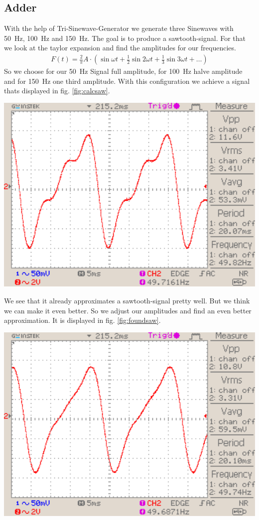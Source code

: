 \documentclass[a4paper,10pt]{article}
\newenvironment{Figure}
        {\par\medskip\noindent\minipage{\linewidth}}
        {\endminipage\par\medskip}
\numberwithin{equation}{section}
\begin{document}
\begin{multicols}{2}
	\subsection{Adder}
	With the help of Tri-Sinewave-Generator we generate three Sinewaves with \SI{50}{Hz}, \SI{100}{Hz} and \SI{150}{Hz}. The goal is to produce a sawtooth-signal. For that we look at the taylor expansion and find the amplitudes for our frequencies.
	\begin{align}
		F(t)=\frac{2}{\pi}A\cdot\left(\sin{\omega t}+\frac{1}{2}\sin{2\omega t}+\frac{1}{3}\sin{3\omega t}+\dots\right)
	\end{align}
	So we choose for our \SI{50}{Hz} Signal full amplitude, for \SI{100}{Hz} halve amplitude and for \SI{150}{Hz} one third amplitude. With this configuration we achieve a signal thats displayed in fig. \ref{fig:calcsaw}.
	\begin{Figure}
		\centering
		\includegraphics[width=1\textwidth]{../data/DS0031_n.png}
		\label{fig:calcsaw}
	\end{Figure}
	We see that it already approximates a sawtooth-signal pretty well. But we think we can make it even better. So we adjust our amplitudes and find an even better approximation. It is displayed in fig. \ref{fig:foundsaw}.
	\begin{Figure}
		\centering
		\includegraphics[width=1\textwidth]{../data/DS0030_n.png}

\end{Figure}
\end{multicols}
\end{document}
